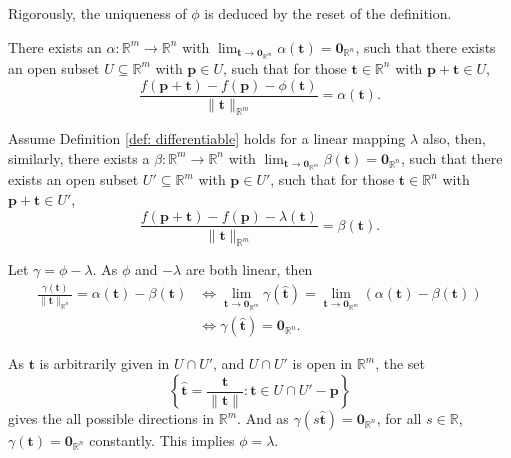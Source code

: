 \begin{note}
	\label{note: differentiable: uniqueness of phi}
	Rigorously, the uniqueness of $\phi$ is deduced by the reset of the definition.
	
	There exists an $\alpha: \mathbb R^m \to \mathbb R^n$ with $\displaystyle \lim_{\mathbf t \to \mathbf 0_{\mathbb R^m}} \alpha(\mathbf t) = \mathbf 0_{\mathbb R^n}$, such that there exists an open subset $U \subseteq \mathbb R^m$ with $\mathbf p \in U$, such that for those $\mathbf t \in \mathbb R^n$ with $\mathbf p + \mathbf t \in U$,
		$$
		\frac{f(\mathbf p + \mathbf t) - f(\mathbf p) - \phi(\mathbf t)}{\| \mathbf t \|_{\mathbb R^m}} = \alpha(\mathbf t).
		$$
		
	Assume Definition \ref{def: differentiable} holds for a linear mapping $\lambda$ also, then, similarly, there exists a $\beta: \mathbb R^m \to \mathbb R^n$ with $\displaystyle \lim_{\mathbf t \to \mathbf 0_{\mathbb R^m}} \beta(\mathbf t) = \mathbf 0_{\mathbb R^n}$, such that there exists an open subset $U' \subseteq \mathbb R^m$ with $\mathbf p \in U'$, such that for those $\mathbf t \in \mathbb R^n$ with $\mathbf p + \mathbf t \in U'$,
	$$
	\frac{f(\mathbf p + \mathbf t) - f(\mathbf p) - \lambda(\mathbf t)}{\| \mathbf t \|_{\mathbb R^m}} = \beta(\mathbf t).
	$$
	
	Let $\gamma = \phi - \lambda$. As $\phi$ and $-\lambda$ are both linear, then
	$$
	\begin{aligned}
		\frac{\gamma(\mathbf t)}{\| \mathbf t \|_{\mathbb R^n}} = \alpha(\mathbf t) - \beta(\mathbf t) &\iff \lim_{\mathbf t \to \mathbf 0_{\mathbb R^m}} \gamma(\mathbf{\hat t}) = \lim_{\mathbf t \to \mathbf 0_{\mathbb R^m}} (\alpha(\mathbf t) - \beta(\mathbf t)) \\
		&\iff \gamma(\mathbf{\hat t}) = \mathbf 0_{\mathbb R^n}.
	\end{aligned}
	$$
	
	As $\mathbf t$ is arbitrarily given in $U \cap U'$, and $U \cap U'$ is open in $\mathbb R^m$, the set
	$$
	\left\{ \mathbf{\hat t} = \frac{\mathbf t}{\| \mathbf t \|} : \mathbf t \in U \cap U' - \mathbf p \right\}
	$$
	gives the all possible directions in $\mathbb R^m$. And as $\gamma(s\mathbf{\hat t}) = \mathbf 0_{\mathbb R^n}$, for all $s \in \mathbb R$, $\gamma(\mathbf t) = \mathbf 0_{\mathbb R^n}$ constantly. This implies $\phi = \lambda$.
\end{note}


